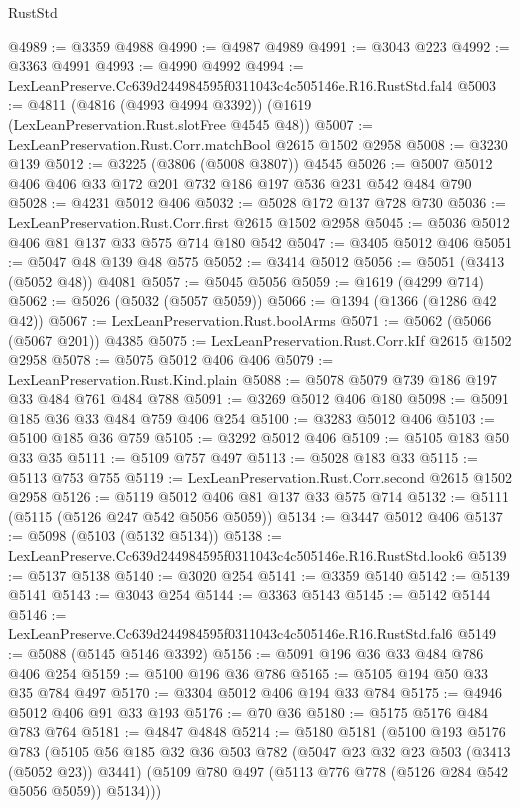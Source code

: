 \begin{lexlean}{RustStd}
\begin{coremodule}
@4989 := @3359 @4988
@4990 := @4987 @4989
@4991 := @3043 @223
@4992 := @3363 @4991
@4993 := @4990 @4992
@4994 := LexLeanPreserve.Cc639d244984595f0311043c4c505146e.R16.RustStd.fal4
@5003 := @4811 (@4816 (@4993 @4994 @3392)) (@1619 (LexLeanPreservation.Rust.slotFree @4545 @48))
@5007 := LexLeanPreservation.Rust.Corr.matchBool @2615 @1502 @2958
@5008 := @3230 @139
@5012 := @3225 (@3806 (@5008 @3807)) @4545
@5026 := @5007 @5012 @406 @406 @33 @172 @201 @732 @186 @197 @536 @231 @542 @484 @790
@5028 := @4231 @5012 @406
@5032 := @5028 @172 @137 @728 @730
@5036 := LexLeanPreservation.Rust.Corr.first @2615 @1502 @2958
@5045 := @5036 @5012 @406 @81 @137 @33 @575 @714 @180 @542
@5047 := @3405 @5012 @406
@5051 := @5047 @48 @139 @48 @575
@5052 := @3414 @5012
@5056 := @5051 (@3413 (@5052 @48)) @4081
@5057 := @5045 @5056
@5059 := @1619 (@4299 @714)
@5062 := @5026 (@5032 (@5057 @5059))
@5066 := @1394 (@1366 (@1286 @42 @42))
@5067 := LexLeanPreservation.Rust.boolArms
@5071 := @5062 (@5066 (@5067 @201)) @4385
@5075 := LexLeanPreservation.Rust.Corr.kIf @2615 @1502 @2958
@5078 := @5075 @5012 @406 @406
@5079 := LexLeanPreservation.Rust.Kind.plain
@5088 := @5078 @5079 @739 @186 @197 @33 @484 @761 @484 @788
@5091 := @3269 @5012 @406 @180
@5098 := @5091 @185 @36 @33 @484 @759 @406 @254
@5100 := @3283 @5012 @406
@5103 := @5100 @185 @36 @759
@5105 := @3292 @5012 @406
@5109 := @5105 @183 @50 @33 @35
@5111 := @5109 @757 @497
@5113 := @5028 @183 @33
@5115 := @5113 @753 @755
@5119 := LexLeanPreservation.Rust.Corr.second @2615 @1502 @2958
@5126 := @5119 @5012 @406 @81 @137 @33 @575 @714
@5132 := @5111 (@5115 (@5126 @247 @542 @5056 @5059))
@5134 := @3447 @5012 @406
@5137 := @5098 (@5103 (@5132 @5134))
@5138 := LexLeanPreserve.Cc639d244984595f0311043c4c505146e.R16.RustStd.look6
@5139 := @5137 @5138
@5140 := @3020 @254
@5141 := @3359 @5140
@5142 := @5139 @5141
@5143 := @3043 @254
@5144 := @3363 @5143
@5145 := @5142 @5144
@5146 := LexLeanPreserve.Cc639d244984595f0311043c4c505146e.R16.RustStd.fal6
@5149 := @5088 (@5145 @5146 @3392)
@5156 := @5091 @196 @36 @33 @484 @786 @406 @254
@5159 := @5100 @196 @36 @786
@5165 := @5105 @194 @50 @33 @35 @784 @497
@5170 := @3304 @5012 @406 @194 @33 @784
@5175 := @4946 @5012 @406 @91 @33 @193
@5176 := @70 @36
@5180 := @5175 @5176 @484 @783 @764
@5181 := @4847 @4848
@5214 := @5180
    @5181
    (@5100
      @193
      @5176
      @783
      (@5105
        @56
        @185
        @32
        @36
        @503
        @782
        (@5047 @23 @32 @23 @503 (@3413 (@5052 @23)) @3441)
        (@5109 @780 @497 (@5113 @776 @778 (@5126 @284 @542 @5056 @5059)) @5134)))

\end{coremodule}
\end{lexlean}
